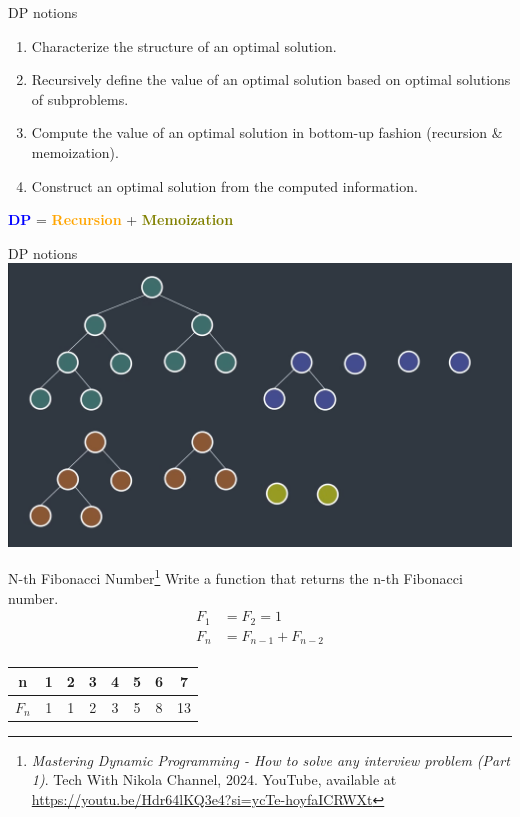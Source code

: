 \documentclass{beamer}
\begin{document}
\begin{frame}{DP notions}
    \begin{enumerate}
        \item Characterize the structure of an optimal solution.
        \item Recursively deﬁne the value of an optimal solution based on optimal solutions of subproblems.
        \item Compute the value of an optimal solution in bottom-up fashion (recursion \& memoization).
        \item Construct an optimal solution from the computed information.
    \end{enumerate}
    \vspace{10mm}
    \centering
    \Large
    \textcolor{blue}{\textbf{DP}} = \textcolor{orange}{\textbf{Recursion}} + \textcolor{olive}{\textbf{Memoization}}
\end{frame}

\begin{frame}{DP notions}
    \centering
    \includegraphics[width=\textwidth]{figures/dp01.png}
\end{frame}

\begin{frame}{N-th Fibonacci Number\footnote{\scriptsize \textit{Mastering Dynamic Programming - How to solve any interview problem (Part 1)}. Tech With Nikola Channel, 2024. YouTube, available at \url{https://youtu.be/Hdr64lKQ3e4?si=ycTe-hoyfaICRWXt}}}
    Write a function that returns the n-th Fibonacci number.
    \begin{equation*}
        \begin{align*}
            F_1 &= F_2 = 1 \\
            F_n &= F_{n - 1} + F_{n - 2} \\
        \end{align*}
    \end{equation*}
    \centering
    \LARGE
    \begin{tabular}{| c | c | c | c | c | c | c | c |} \hline
        n & 1 & 2 & 3 & 4 & 5 & 6 & 7  \\ \hline
    $F_n$ & 1 & 1 & 2 & 3 & 5 & 8 & 13 \\ \hline
    \end{tabular}
\end{frame}
\end{document}

